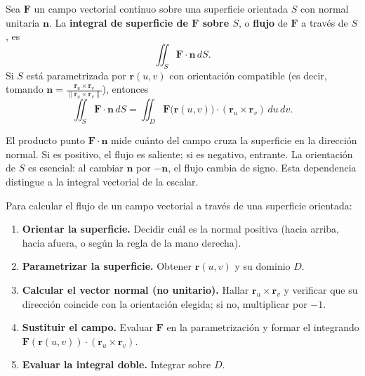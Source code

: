 \begin{definition}
Sea $\mathbf{F}$ un campo vectorial continuo sobre una superficie orientada $S$ con normal unitaria $\mathbf{n}$. La \textbf{integral de superficie de $\mathbf{F}$ sobre $S$}, o \textbf{flujo} de $\mathbf{F}$ a través de $S$, es
\[
\iint_S \mathbf{F}\cdot\mathbf{n}\,dS.
\]
Si $S$ está parametrizada por $\mathbf{r}(u,v)$ con orientación compatible (es decir, tomando $\mathbf{n} = \frac{\mathbf{r}_u \times \mathbf{r}_v}{\|\mathbf{r}_u \times \mathbf{r}_v\|}$), entonces
\[
\iint_S \mathbf{F}\cdot\mathbf{n}\,dS
=
\iint_D \mathbf{F}\bigl(\mathbf{r}(u,v)\bigr)\cdot(\mathbf{r}_u \times \mathbf{r}_v)\,du\,dv.
\]
\end{definition}

\begin{rem}
El producto punto $\mathbf{F}\cdot\mathbf{n}$ mide cuánto del campo cruza la superficie en la dirección normal. Si es positivo, el flujo es saliente; si es negativo, entrante. La orientación de $S$ es esencial: al cambiar $\mathbf{n}$ por $-\mathbf{n}$, el flujo cambia de signo. Esta dependencia distingue a la integral vectorial de la escalar.
\end{rem}

\begin{pasos}
Para calcular el flujo de un campo vectorial a través de una superficie orientada:
\begin{enumerate}
\item \textbf{Orientar la superficie.} Decidir cuál es la normal positiva (hacia arriba, hacia afuera, o según la regla de la mano derecha).
\item \textbf{Parametrizar la superficie.} Obtener $\mathbf{r}(u,v)$ y su dominio $D$.
\item \textbf{Calcular el vector normal (no unitario).} Hallar $\mathbf{r}_u \times \mathbf{r}_v$ y verificar que su dirección coincide con la orientación elegida; si no, multiplicar por $-1$.
\item \textbf{Sustituir el campo.} Evaluar $\mathbf{F}$ en la parametrización y formar el integrando $\mathbf{F}(\mathbf{r}(u,v)) \cdot (\mathbf{r}_u \times \mathbf{r}_v)$.
\item \textbf{Evaluar la integral doble.} Integrar sobre $D$.
\end{enumerate}
\end{pasos}

